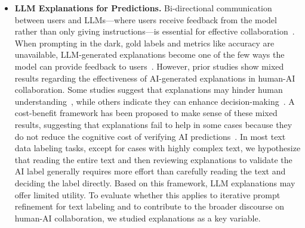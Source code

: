 \begin{itemize}
\item
\textbf{LLM Explanations for Predictions.}
Bi-directional communication between users and LLMs---where users receive feedback from the model rather than only giving instructions---is essential for effective collaboration~\cite{shen2024towards}.
When prompting in the dark, gold labels and metrics like accuracy are unavailable, LLM-generated explanations become one of the few ways the model can provide feedback to users~\cite{teso2023leveraging,kulesza2015principles}.
However, prior studies show mixed results regarding the effectiveness of AI-generated explanations in human-AI collaboration. 
Some studies suggest that explanations may hinder human understanding~\cite{turpin2024language,shen2020useful}, while others indicate they can enhance decision-making~\cite{singh2024rethinking,10.1145/3579605}.
A cost-benefit framework has been proposed to make sense of these mixed results, suggesting that explanations fail to help in some cases because they do not reduce the cognitive cost of verifying AI predictions~\cite{10.1145/3579605}.
In most text data labeling tasks, except for cases with highly complex text, we hypothesize that reading the entire text and then reviewing explanations to validate the AI label generally requires more effort than carefully reading the text and deciding the label directly. 
Based on this framework, LLM explanations may offer limited utility. 
To evaluate whether this applies to iterative prompt refinement for text labeling and to contribute to the broader discourse on human-AI collaboration, we studied explanations as a key variable.










\end{itemize}


